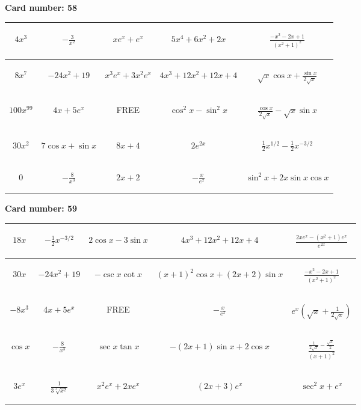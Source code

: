 \documentclass{article}
\newcommand{\entry}[1]{\begin{minipage}[t][2.75cm][t]{4cm} \vspace{1cm} \begin{center}#1\end{center} \end{minipage}}
\newcommand{\freespace}{\entry{FREE}}
\newcommand{\cardnumber}[1]{\noindent \textbf{Card number: #1} \bigskip}
\begin{document}
\pagebreak

\cardnumber{58}
\begin{center}
\begin{tabular}{|*{5}{c|}}
    \hline
    \entry{$4x^3$} & \entry{$-\frac{3}{x^2}$} & \entry{$x e^x + e^x$} & \entry{$5x^4 + 6x^2 + 2x$} & \entry{$\frac{-x^2 - 2x + 1}{(x^2 + 1)^2}$} \\ \hline
    \entry{$8x^7$} & \entry{$-24x^2 + 19$} & \entry{$x^3 e^x + 3x^2 e^x$} & \entry{$4x^3 + 12x^2 + 12x + 4$} & \entry{$\sqrt{x} \cos x + \frac{\sin x}{2 \sqrt{x}}$} \\ \hline
    \entry{$100x^{99}$} & \entry{$4x + 5e^x$} & \freespace & \entry{$\cos^2 x - \sin^2 x$} & \entry{$\frac{\cos x}{2 \sqrt{x}} - \sqrt{x} \sin x$} \\ \hline
    \entry{$30x^2$} & \entry{$7 \cos x + \sin x$} & \entry{$8x + 4$} & \entry{$2e^{2x}$} & \entry{$\frac{1}{2} x^{1/2} - \frac{1}{2} x^{-3/2}$} \\ \hline
    \entry{$0$} & \entry{$-\frac{8}{x^3}$} & \entry{$2x + 2$} & \entry{$-\frac{x}{e^x}$} & \entry{$\sin^2 x + 2x \sin x \cos x$} \\ \hline
\end{tabular}
\end{center}

\pagebreak

\cardnumber{59}
\begin{center}
\begin{tabular}{|*{5}{c|}}
    \hline
    \entry{$18x$} & \entry{$-\frac{1}{2} x^{-3/2}$} & \entry{$2 \cos x - 3 \sin x$} & \entry{$4x^3 + 12x^2 + 12x + 4$} & \entry{$\frac{2x e^x - (x^2 + 1) e^x}{e^{2x}}$} \\ \hline
    \entry{$30x$} & \entry{$-24x^2 + 19$} & \entry{$-\csc x \cot x$} & \entry{$(x + 1)^2 \cos x + (2x + 2) \sin x$} & \entry{$\frac{-x^2 - 2x + 1}{(x^2 + 1)^2}$} \\ \hline
    \entry{$-8x^3$} & \entry{$4x + 5e^x$} & \freespace & \entry{$-\frac{x}{e^x}$} & \entry{$e^x \left(\sqrt{x} + \frac{1}{2\sqrt{x}}\right)$} \\ \hline
    \entry{$\cos x$} & \entry{$-\frac{8}{x^3}$} & \entry{$\sec x \tan x$} & \entry{$-(2x + 1) \sin x + 2 \cos x$} & \entry{$\frac{\frac{1}{2 \sqrt{x}} - \frac{\sqrt{x}}{2}}{(x + 1)^2}$} \\ \hline
    \entry{$3e^x$} & \entry{$\frac{1}{3\sqrt[3]{x^2}}$} & \entry{$x^2 e^x + 2x e^x$} & \entry{$(2x + 3) e^x$} & \entry{$\sec^2 x + e^x$} \\ \hline
\end{tabular}
\end{center}
\end{document}
